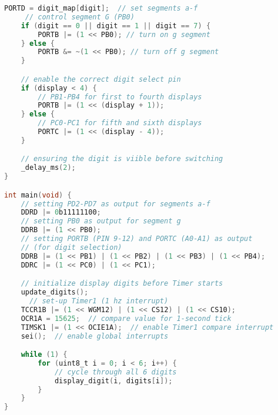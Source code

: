 \documentclass[12pt,a4paper]{article}
\begin{document}
\begin{lstlisting}[language=C, basicstyle=\ttfamily, keywordstyle=\color{blue}, commentstyle=\color{green}]
    PORTD = digit_map[digit];  // set segments a-f
     // control segment G (PB0)
    if (digit == 0 || digit == 1 || digit == 7) {
        PORTB |= (1 << PB0); // turn on g segment
    } else {
        PORTB &= ~(1 << PB0); // turn off g segment
    }

    // enable the correct digit select pin
    if (display < 4) {
        // PB1-PB4 for first to fourth displays
        PORTB |= (1 << (display + 1));
    } else {
        // PC0-PC1 for fifth and sixth displays
        PORTC |= (1 << (display - 4));
    }

    // ensuring the digit is viible before switching
    _delay_ms(2);
}

int main(void) {
    // setting PD2-PD7 as output for segments a-f
    DDRD |= 0b11111100;
    // setting PB0 as output for segment g
    DDRB |= (1 << PB0);
    // setting PORTB (PIN 9-12) and PORTC (A0-A1) as output 
    // (for digit selection)
    DDRB |= (1 << PB1) | (1 << PB2) | (1 << PB3) | (1 << PB4);
    DDRC |= (1 << PC0) | (1 << PC1);

    // initialize display digits before Timer starts
    update_digits();
      // set-up Timer1 (1 hz interrupt)
    TCCR1B |= (1 << WGM12) | (1 << CS12) | (1 << CS10);
    OCR1A = 15625;  // compare value for 1-second tick
    TIMSK1 |= (1 << OCIE1A);  // enable Timer1 compare interrupt
    sei();  // enable global interrupts

    while (1) {
        for (uint8_t i = 0; i < 6; i++) {
            // cycle through all 6 digits
            display_digit(i, digits[i]);
        }
    }
}
\end{lstlisting}
\end{document}

